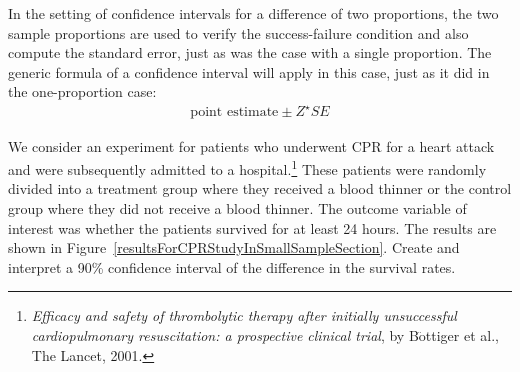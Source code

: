 
In the setting of confidence intervals for a difference
of two proportions, the two sample proportions are used
to verify the success-failure condition and also compute
the standard error, just as was the case with a single
proportion.
The generic formula of a confidence interval will apply
in this case, just as it did in the one-proportion case:
\begin{align*}
\text{point estimate} \pm Z^{\star} SE
\end{align*}

\begin{examplewrap}
\begin{nexample}{We consider an experiment for patients
    who underwent CPR for a heart attack and were
    subsequently admitted to a
    hospital.\footnote{\emph{Efficacy and safety of
      thrombolytic therapy after initially unsuccessful
      cardiopulmonary resuscitation: a prospective
      clinical trial}, by B$\ddot{\text{o}}$ttiger et al.,
      The Lancet, 2001.}
    These patients were randomly divided into a treatment
    group where they received a blood thinner or the control
    group where they did not receive a blood thinner.
    The outcome variable of interest was whether the
    patients survived for at least 24 hours.
    The results are shown in
    Figure~\ref{resultsForCPRStudyInSmallSampleSection}.
    Create and interpret a 90\% confidence interval of the
    difference in the survival rates.}


\end{nexample}
\end{examplewrap}
